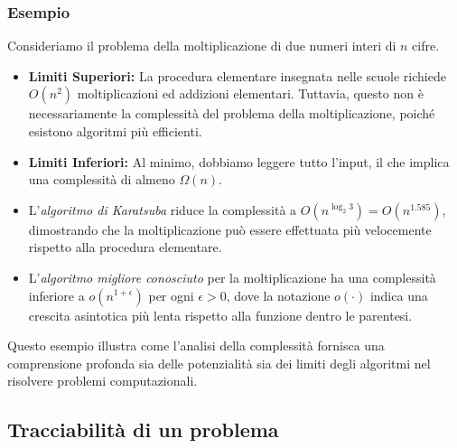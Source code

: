 \subsubsection{Esempio}
Consideriamo il problema della moltiplicazione di due numeri interi di \(n\) cifre.
\begin{itemize}
    \item \textbf{Limiti Superiori:} La procedura elementare insegnata nelle scuole
    richiede \(O(n^2)\) moltiplicazioni ed addizioni elementari. Tuttavia, questo non
    è necessariamente la complessità del problema della moltiplicazione, poiché esistono
    algoritmi più efficienti.
    \item \textbf{Limiti Inferiori:} Al minimo, dobbiamo leggere tutto l'input, il che
    implica una complessità di almeno \(\Omega(n)\).
    \item L'\textit{algoritmo di Karatsuba} riduce la complessità a
    \(O(n^{\log_2 3}) = O(n^{1.585})\), dimostrando che la moltiplicazione può essere
    effettuata più velocemente rispetto alla procedura elementare.
    \item L'\textit{algoritmo migliore conosciuto} per la moltiplicazione ha una
    complessità inferiore a \(o(n^{1+\epsilon})\) per ogni \(\epsilon > 0\), dove
    la notazione \(o(\cdot)\) indica una crescita asintotica più lenta rispetto alla
    funzione dentro le parentesi.
\end{itemize}

Questo esempio illustra come l'analisi della complessità fornisca una comprensione
profonda sia delle potenzialità sia dei limiti degli algoritmi nel risolvere problemi
computazionali.

\subsection{Tracciabilità di un problema}
